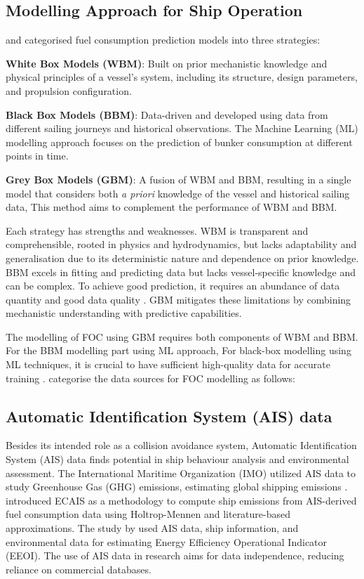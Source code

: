 \documentclass[]{interact}
\theoremstyle{plain}%
\theoremstyle{definition}
\theoremstyle{remark}
\begin{document}
\subsection{Modelling Approach for Ship Operation}\label{sec:modelling_type}

\citet{haranen2016white} and \citet{Coraddu.2017} categorised fuel consumption prediction models into three strategies:

\textbf{White Box Models (WBM)}: Built on prior mechanistic knowledge and physical principles of a vessel's system, including its structure, design parameters, and propulsion configuration.

\textbf{Black Box Models (BBM)}: Data-driven and developed using data from different sailing journeys and historical observations. The Machine Learning (ML) modelling approach focuses on the prediction of bunker consumption at different points in time.

\textbf{Grey Box Models (GBM)}: A fusion of WBM and BBM, resulting in a single model that considers both \emph{a priori} knowledge of the vessel and historical sailing data, This method aims to complement the performance of WBM and BBM.

Each strategy has strengths and weaknesses. WBM is transparent and comprehensible, rooted in physics and hydrodynamics, but lacks adaptability and generalisation due to its deterministic nature and dependence on prior knowledge. BBM excels in fitting and predicting data but lacks vessel-specific knowledge and can be complex. To achieve good prediction, it requires an abundance of data quantity and good data quality \citep{Halevy.2009}. GBM mitigates these limitations by combining mechanistic understanding with predictive capabilities.

The modelling of FOC using GBM requires both components of WBM and BBM. For the BBM modelling part using ML approach, For black-box modelling using ML techniques, it is crucial to have sufficient high-quality data for accurate training \citep{Halevy.2009}. \citet{Yan.2021} categorise the data sources for FOC modelling as follows:

\subsection{Automatic Identification System (AIS) data}\label{sec:ais_theo_j}

Besides its intended role as a collision avoidance system, Automatic Identification System (AIS) data finds potential in ship behaviour analysis and environmental assessment. The International Maritime Organization (IMO) utilized AIS data to study Greenhouse Gas (GHG) emissions, estimating global shipping emissions \citep{IMO.2020,T.W.P.Smith.2015}. \citet{Rakke.2016} introduced ECAIS as a methodology to compute ship emissions from AIS-derived fuel consumption data using Holtrop-Mennen and literature-based approximations. The study by \citet{Kim.2020b} used AIS data, ship information, and environmental data for estimating Energy Efficiency Operational Indicator (EEOI). The use of AIS data in research aims for data independence, reducing reliance on commercial databases.
\end{document}
